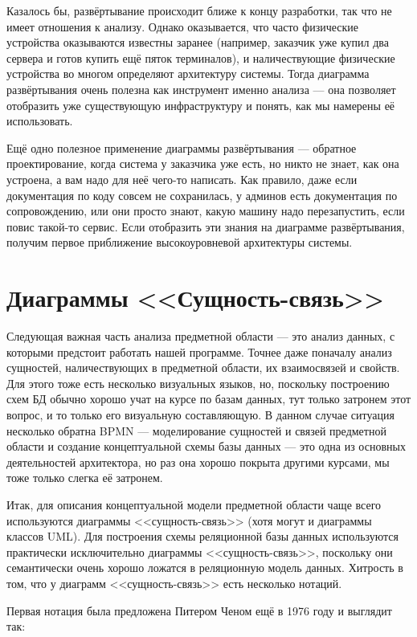 \documentclass{../../text-style}
\begin{document}
Казалось бы, развёртывание происходит ближе к концу разработки, так что не имеет отношения к анализу. Однако оказывается, что часто физические устройства оказываются известны заранее (например, заказчик уже купил два сервера и готов купить ещё пяток терминалов), и наличествующие физические устройства во многом определяют архитектуру системы. Тогда диаграмма развёртывания очень полезна как инструмент именно анализа --- она позволяет отобразить уже существующую инфраструктуру и понять, как мы намерены её использовать.

Ещё одно полезное применение диаграммы развёртывания --- обратное проектирование, когда система у заказчика уже есть, но никто не знает, как она устроена, а вам надо для неё чего-то написать. Как правило, даже если документация по коду совсем не сохранилась, у админов есть документация по сопровождению, или они просто знают, какую машину надо перезапустить, если повис такой-то сервис. Если отобразить эти знания на диаграмме развёртывания, получим первое приближение высокоуровневой архитектуры системы.

\section{Диаграммы <<Сущность-связь>>}

Следующая важная часть анализа предметной области --- это анализ данных, с которыми предстоит работать нашей программе. Точнее даже поначалу анализ сущностей, наличествующих в предметной области, их взаимосвязей и свойств. Для этого тоже есть несколько визуальных языков, но, поскольку построению схем БД обычно хорошо учат на курсе по базам данных, тут только затронем этот вопрос, и то только его визуальную составляющую. В данном случае ситуация несколько обратна BPMN --- моделирование сущностей и связей предметной области и создание концептуальной схемы базы данных --- это одна из основных деятельностей архитектора, но раз она хорошо покрыта другими курсами, мы тоже только слегка её затронем.

Итак, для описания концептуальной модели предметной области чаще всего используются диаграммы <<сущность-связь>> (хотя могут и диаграммы классов UML). Для построения схемы реляционной базы данных используются практически исключительно диаграммы <<сущность-связь>>, поскольку они семантически очень хорошо ложатся в реляционную модель данных. Хитрость в том, что у диаграмм <<сущность-связь>> есть несколько нотаций.

Первая нотация была предложена Питером Ченом ещё в 1976 году и выглядит так:
\end{document}
